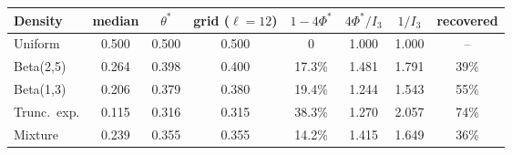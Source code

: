 \begin{tabular}{lccccccc}
\toprule
Density & median & $\theta^\ast$ & grid ($\ell{=}12$) & $1-4\Phi^\ast$ & $4\Phi^\ast/I_3$ & $1/I_3$ & recovered\\
\midrule
Uniform & 0.500 & 0.500 & 0.500 & 0 & 1.000 & 1.000 & --\\
Beta(2,5) & 0.264 & 0.398 & 0.400 & 17.3\% & 1.481 & 1.791 & 39\%\\
Beta(1,3) & 0.206 & 0.379 & 0.380 & 19.4\% & 1.244 & 1.543 & 55\%\\
Trunc.\ exp. & 0.115 & 0.316 & 0.315 & 38.3\% & 1.270 & 2.057 & 74\%\\
Mixture & 0.239 & 0.355 & 0.355 & 14.2\% & 1.415 & 1.649 & 36\%\\
\bottomrule
\end{tabular}
